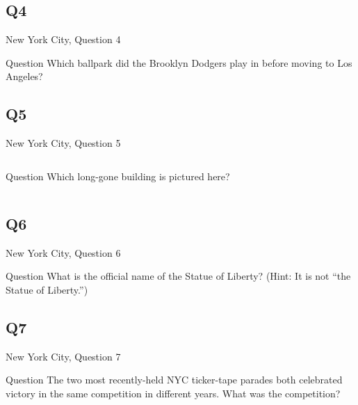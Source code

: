 \documentclass[11pt]{beamer}
\begin{document}
\subsection*{Q4}
\begin{frame}[t]{New York City, Question 4}
\begin{block}{Question}
Which ballpark did the Brooklyn Dodgers play in before moving to Los Angeles?
\end{block}
\end{frame}
\subsection*{Q5}
\begin{frame}[t]{New York City, Question 5}
\begin{columns}[T,totalwidth=\linewidth]
\begin{column}{0.32\linewidth}
\begin{block}{Question}
Which long-gone building is pictured here?
\end{block}
\end{column}
\begin{column}{0.65\linewidth}
\begin{center}
\texttt{[image: \{Images/singerbuilding]}.jpg}
\end{center}
\end{column}
\end{columns}
\end{frame}
\subsection*{Q6}
\begin{frame}[t]{New York City, Question 6}
\begin{block}{Question}
What is the official name of the Statue of Liberty? (Hint: It is not ``the Statue of Liberty.'')
\end{block}
\end{frame}
\subsection*{Q7}
\begin{frame}[t]{New York City, Question 7}
\begin{block}{Question}
The two most recently-held NYC ticker-tape parades both celebrated victory in the same competition in different years. What was the competition?
\end{block}
\end{frame}
\end{document}
